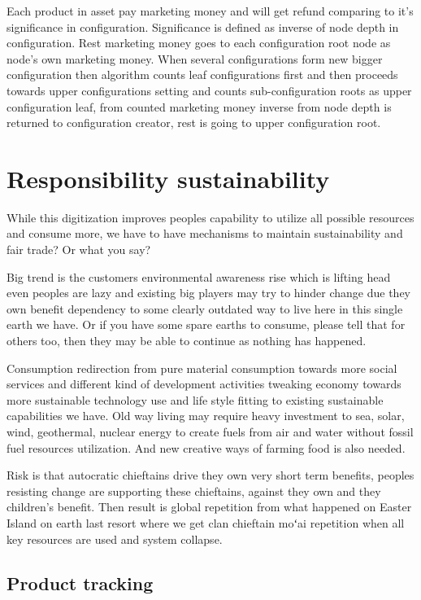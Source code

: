 Each product in asset pay marketing money and will get refund comparing to
it's significance in configuration. Significance is defined as inverse of node
depth in configuration. Rest marketing money goes to each configuration root
node as node's own marketing money. When several configurations form new
bigger configuration then algorithm counts leaf configurations first and then
proceeds towards upper configurations setting and counts sub-configuration
roots as upper configuration leaf, from counted marketing money inverse from
node depth is returned to configuration creator, rest is going to upper
configuration root.

\section{Responsibility sustainability}
\label{responsibility_sustainability}

While this digitization improves peoples capability to utilize all possible
resources and consume more, we have to have mechanisms to maintain
sustainability and fair trade? Or what you say?

Big trend is the customers environmental awareness rise which is lifting head
even peoples are lazy and existing  big players may try to hinder change due
they own  benefit dependency to some clearly outdated way to live here in this
single earth we have. Or if you have some spare earths to consume, please tell
that for others too, then they may be able to continue as nothing has
happened.

Consumption redirection from pure material consumption towards more social
services and different kind of development activities tweaking economy towards
more sustainable technology use and life style fitting to existing sustainable
capabilities we have. Old way living may require heavy investment to sea,
solar, wind, geothermal, nuclear energy to create fuels from air and water
without fossil fuel resources utilization. And new creative ways of farming
food is also needed.

Risk is that autocratic chieftains drive they own very short term benefits,
peoples resisting change are supporting these chieftains, against they own and
they children's benefit. Then result is global repetition from what happened
on Easter Island on earth last resort where we get clan chieftain moʻai
repetition when all key resources are used and system collapse.

\subsection{Product tracking}
\label{product_tracking}

